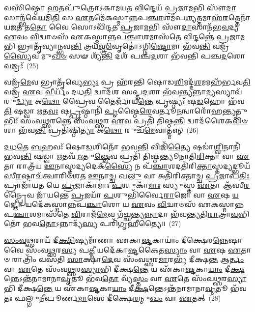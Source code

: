 {\anuvakamend[{\-\ul{𑌅}\-\-\ul{𑌤𑌿}\-\-\ul{𑌰𑌾}\-𑌤𑍍𑌰 𑌓𑌜᳴\-\ul{𑌸𑍍𑌯𑍇}\-𑌵 𑌷𑌟𑍍𑌤𑍍𑌰𑌿𑍞᳴𑌶𑌚𑍍𑌚}]}%

𑌵𑌸𑌿᳴𑌷𑍍𑌠𑍋 \ul{𑌹}\-𑌤𑌪𑍁᳴𑌤𑍍𑌰𑍋\-𑌽𑌕𑌾𑌮𑌯𑌤 \ul{𑌵𑌿}\-𑌨𑍍𑌦𑍇𑌯᳴ \ul{𑌪𑍍𑌰}\-𑌜𑌾\-\ul{𑌮}\-𑌭𑌿 𑌸𑍗᳴\-\ul{𑌦𑌾}\-𑌸𑌾𑌨𑍍𑌭᳴𑌵𑍇\-\ul{𑌯}\-𑌮𑌿\-\ul{𑌤𑌿} 𑌸 \ul{𑌏}\-𑌤𑌮𑍇᳴𑌕𑌸𑍍𑌮𑌾𑌨𑍍𑌨𑌪\-\ul{𑌞𑍍𑌚𑌾}\-𑌶𑌮᳴𑌪\-\ul{𑌶𑍍𑌯}\-𑌤𑍍𑌤𑌮𑌾𑌹᳴\-\ul{𑌰}\-𑌤𑍍𑌤𑍇𑌨𑌾᳴𑌯𑌜\-\ul{𑌤} 𑌤\-\ul{𑌤𑍋} 𑌵𑍈 𑌸𑍋\-𑌽𑌵𑌿᳴𑌨𑍍𑌦𑌤 \ul{𑌪𑍍𑌰}\-𑌜𑌾\-\ul{𑌮}\-𑌭𑌿 𑌸𑍗᳴\-\ul{𑌦𑌾}\-𑌸𑌾𑌨᳴𑌭\-\ul{𑌵}\-𑌦𑍍𑌯 \ul{𑌏}\-𑌵𑌂 \ul{𑌵𑌿}\-𑌦𑍍𑌵𑌾𑍞𑌸᳴ 𑌏𑌕𑌸𑍍𑌮𑌾𑌨𑍍𑌨𑌪\-\ul{𑌞𑍍𑌚𑌾}\-𑌶𑌮𑌾𑌸᳴𑌤𑍇 \ul{𑌵𑌿}\-𑌨𑍍𑌦𑌨𑍍𑌤𑍇॑ \ul{𑌪𑍍𑌰}\-𑌜𑌾\-\ul{𑌮}\-𑌭𑌿 𑌭𑍍𑌰𑌾𑌤𑍃᳴𑌵𑍍𑌯𑌾𑌨𑍍𑌭𑌵\-\ul{𑌨𑍍𑌤𑌿} 𑌤𑍍𑌰𑌯᳴\-\ul{𑌸𑍍𑌤𑍍𑌰𑌿}\-𑌵𑍃𑌤𑍋॑\-𑌽𑌗𑍍𑌨𑌿\-\ul{𑌷𑍍𑌟𑍋}\-𑌮𑌾 𑌭᳴𑌵\-\ul{𑌨𑍍𑌤𑌿} 𑌵𑌜𑍍𑌰᳴\-\ul{𑌸𑍍𑌯𑍈}\-𑌵 𑌮𑍁\-\ul{𑌖}\-\-\ul{𑍞} 𑌸𑍟 𑌶𑍍𑌯᳴\-\ul{𑌨𑍍𑌤𑌿} 𑌦𑌶᳴ 𑌪𑌞𑍍𑌚\-\ul{𑌦}\-𑌶𑌾 𑌭᳴𑌵𑌨𑍍𑌤𑌿 𑌪𑌞𑍍𑌚\-\ul{𑌦}\-𑌶𑍋 𑌵𑌜𑍍𑌰𑌃᳴~(25)

𑌵𑌜𑍍𑌰᳴\-\ul{𑌮𑍇}\-𑌵 𑌭𑍍𑌰𑌾𑌤𑍃᳴𑌵𑍍𑌯𑍇\-\ul{𑌭𑍍𑌯𑌃} 𑌪𑍍𑌰 𑌹᳴𑌰𑌨𑍍𑌤𑌿 𑌷𑍋𑌡\-\ul{𑌶𑌿}\-𑌮𑌦𑍍𑌦᳴\-\ul{𑌶}\-𑌮𑌮𑌹᳴𑌰𑍍𑌭𑌵\-\ul{𑌤𑌿} 𑌵𑌜𑍍𑌰᳴ \ul{𑌏}\-𑌵 \ul{𑌵𑍀}\-𑌰𑍍𑌯𑌂᳴ 𑌦𑌧\-\ul{𑌤𑌿} 𑌦𑍍𑌵𑌾𑌦᳴𑌶 𑌸𑌪𑍍𑌤\-\ul{𑌦}\-𑌶𑌾 𑌭᳴𑌵\-\ul{𑌨𑍍𑌤𑍍𑌯}\-𑌨𑍍𑌨𑌾\-\ul{𑌦𑍍𑌯}\-𑌸𑍍𑌯𑌾𑌵᳴𑌰𑍁\-\ul{𑌦𑍍𑌧𑍍𑌯𑌾} 𑌅\-\ul{𑌥𑍋} 𑌪𑍍𑌰𑍈𑌵 𑌤𑍈𑌰𑍍𑌜𑌾᳴𑌯\-\ul{𑌨𑍍𑌤𑍇} 𑌪𑍃𑌷𑍍𑌠𑍍𑌯𑌃᳴ 𑌷\-\ul{𑌡}\-𑌹𑍋 𑌭᳴𑌵\-\ul{𑌤𑌿} 𑌷𑌡𑍍𑌵𑌾 \ul{𑌋}\-𑌤\-\ul{𑌵𑌃} 𑌷\-\ul{𑌟𑍍𑌪𑍃}\-𑌷𑍍𑌠𑌾𑌨𑌿᳴ \ul{𑌪𑍃}\-𑌷𑍍𑌠𑍈\-\ul{𑌰𑍇}\-𑌵𑌰𑍍𑌤𑍂\-\ul{𑌨}\-𑌨𑍍𑌵𑌾𑌰𑍋᳴𑌹\-\ul{𑌨𑍍𑌤𑍍𑌯𑍃}\-𑌤𑍁𑌭𑌿𑌃᳴ 𑌸𑌂𑌵\-\ul{𑌥𑍍𑌸}\-𑌰𑌨𑍍𑌤𑍇 𑌸𑌂᳴𑌵\-\ul{𑌥𑍍𑌸}\-𑌰 \ul{𑌏}\-𑌵 𑌪𑍍𑌰𑌤𑌿᳴ 𑌤𑌿𑌷𑍍𑌠\-\ul{𑌨𑍍𑌤𑌿} 𑌦𑍍𑌵𑌾𑌦᳴𑌶𑍈𑌕\-\ul{𑌵𑌿}\-\-\ul{𑍞}\-𑌶𑌾 𑌭᳴𑌵\-\ul{𑌨𑍍𑌤𑌿} 𑌪𑍍𑌰𑌤𑌿᳴𑌷𑍍𑌠𑌿\-\ul{𑌤𑍍𑌯𑌾} 𑌅\-\ul{𑌥𑍋} 𑌰𑍁𑌚᳴\-\ul{𑌮𑍇}\-𑌵𑌾𑌤𑍍𑌮𑌨𑍍𑌨𑍍~(26)

\-\ul{𑌦}\-\-\ul{𑌧}\-\-\ul{𑌤𑍇} \ul{𑌬}\-𑌹𑌵𑌃᳴ 𑌷𑍋\-\ul{𑌡}\-𑌶𑌿𑌨𑍋᳴ 𑌭𑌵\-\ul{𑌨𑍍𑌤𑌿} 𑌵𑌿𑌜𑌿᳴\-\ul{𑌤𑍍𑌯𑍈} 𑌷𑌡𑌾॑\-\ul{𑌶𑍍𑌵𑌿}\-𑌨𑌾𑌨𑌿᳴ 𑌭𑌵\-\ul{𑌨𑍍𑌤𑌿} 𑌷𑌡𑍍𑌵𑌾 \ul{𑌋}\-𑌤𑌵᳴ \ul{𑌋}\-𑌤𑍁\-\ul{𑌷𑍍𑌵𑍇}\-𑌵 𑌪𑍍𑌰𑌤𑌿᳴ 𑌤𑌿𑌷𑍍𑌠𑌨𑍍𑌤𑍍𑌯𑍂𑌨𑌾𑌤𑌿\-\ul{𑌰𑌿}\-𑌕𑍍𑌤𑌾 𑌵𑌾 \ul{𑌏}\-𑌤𑌾 𑌰𑌾𑌤𑍍𑌰᳴𑌯 \ul{𑌊}\-𑌨𑌾𑌸𑍍𑌤𑌦𑍍𑌯𑌦𑍇𑌕᳴\-\ul{𑌸𑍍𑌯𑍈} 𑌨 𑌪᳴\-\ul{𑌞𑍍𑌚𑌾}\-𑌶𑌦𑌤𑌿᳴𑌰𑌿\-\ul{𑌕𑍍𑌤𑌾}\-𑌸𑍍𑌤𑌦𑍍𑌯𑌦𑍍𑌭𑍂𑌯᳴𑌸𑍀\-\ul{𑌰}\-𑌷𑍍𑌟𑌾𑌚᳴𑌤𑍍𑌵𑌾𑌰𑌿𑍞𑌶𑌤 \ul{𑌊}\-𑌨𑌾\-\ul{𑌚𑍍𑌚} 𑌖\-\ul{𑌲𑍁} 𑌵𑌾 𑌅𑌤𑌿᳴𑌰𑌿𑌕𑍍𑌤𑌾𑌚𑍍𑌚 \ul{𑌪𑍍𑌰}\-𑌜𑌾𑌪᳴\-\ul{𑌤𑌿𑌃} 𑌪𑍍𑌰𑌾𑌜𑌾᳴𑌯\-\ul{𑌤} 𑌯𑍇 \ul{𑌪𑍍𑌰}\-𑌜𑌾𑌕𑌾᳴𑌮𑌾𑌃 \ul{𑌪}\-𑌶𑍁𑌕𑌾᳴\-\ul{𑌮𑌾𑌃} 𑌸𑍍𑌯𑍁𑌸𑍍𑌤 \ul{𑌏}\-𑌤𑌾 𑌆᳴𑌸𑍀\-\ul{𑌰}\-𑌨𑍍𑌪𑍍𑌰𑍈𑌵 𑌜𑌾᳴𑌯𑌨𑍍𑌤𑍇 \ul{𑌪𑍍𑌰}\-𑌜𑌯𑌾᳴ \ul{𑌪}\-𑌶𑍁𑌭𑌿᳴𑌰𑍍𑌵𑍈\-\ul{𑌰𑌾}\-𑌜𑍋 𑌵𑌾 \ul{𑌏}\-𑌷 \ul{𑌯}\-𑌜𑍍𑌞𑍋 𑌯𑌦𑍇᳴𑌕𑌸𑍍𑌮𑌾𑌨𑍍𑌨𑌪\-\ul{𑌞𑍍𑌚𑌾}\-𑌶𑍋 𑌯 \ul{𑌏}\-𑌵𑌂 \ul{𑌵𑌿}\-𑌦𑍍𑌵𑌾𑍞𑌸᳴ 𑌏𑌕𑌸𑍍𑌮𑌾𑌨𑍍𑌨𑌪\-\ul{𑌞𑍍𑌚𑌾}\-𑌶𑌮𑌾𑌸᳴𑌤𑍇 \ul{𑌵𑌿}\-𑌰𑌾𑌜᳴\-\ul{𑌮𑍇}\-𑌵 𑌗᳴𑌚𑍍𑌛𑌨𑍍𑌤𑍍𑌯\-\ul{𑌨𑍍𑌨𑌾}\-𑌦𑌾 𑌭᳴𑌵𑌨𑍍𑌤𑍍𑌯𑌤𑌿\-\ul{𑌰𑌾}\-𑌤𑍍𑌰𑌾\-\ul{𑌵}\-𑌭𑌿𑌤𑍋᳴ 𑌭𑌵\-\ul{𑌤𑍋}\-\-𑌽𑌨𑍍𑌨𑌾𑌦𑍍𑌯᳴\-\ul{𑌸𑍍𑌯} 𑌪𑌰𑌿᳴𑌗𑍃𑌹𑍀𑌤𑍍𑌯𑍈॥~(27)

{\anuvakamend[{𑌵𑌜𑍍𑌰᳴ \ul{𑌆}\-𑌤𑍍𑌮\-\ul{𑌨𑍍𑌪𑍍𑌰}\-𑌜\-\ul{𑌯𑌾} 𑌦𑍍𑌵𑌾𑌵𑌿𑍞᳴𑌶𑌤𑌿𑌶𑍍𑌚}]}%

\-\ul{𑌸𑌂}\-\-\ul{𑌵}\-\-\ul{𑌥𑍍𑌸}\-𑌰𑌾𑌯᳴ 𑌦𑍀\-\ul{𑌕𑍍𑌷𑌿}\-𑌷𑍍𑌯𑌮𑌾᳴𑌣𑌾 𑌏𑌕𑌾\-\ul{𑌷𑍍𑌟}\-𑌕𑌾𑌯𑌾𑌂॑ 𑌦𑍀𑌕𑍍𑌷𑍇𑌰\-\ul{𑌨𑍍𑌨𑍇}\-𑌷𑌾 𑌵𑍈 𑌸𑌂᳴𑌵\-\ul{𑌥𑍍𑌸}\-𑌰\-\ul{𑌸𑍍𑌯} 𑌪\-\ul{𑌤𑍍𑌨𑍀} 𑌯𑌦𑍇᳴𑌕𑌾\-\ul{𑌷𑍍𑌟}\-𑌕𑍈𑌤\-\ul{𑌸𑍍𑌯𑌾𑌂} 𑌵𑌾 \ul{𑌏}\-𑌷 \ul{𑌏}\-𑌤𑌾𑍞 𑌰𑌾𑌤𑍍𑌰𑌿𑌂᳴ 𑌵𑌸𑌤𑌿 \ul{𑌸𑌾}\-𑌕𑍍𑌷𑌾\-\ul{𑌦𑍇}\-𑌵 𑌸𑌂᳴𑌵\-\ul{𑌥𑍍𑌸}\-𑌰\-\ul{𑌮𑌾}\-𑌰𑌭𑍍𑌯᳴ 𑌦𑍀𑌕𑍍𑌷\-\ul{𑌨𑍍𑌤} 𑌆\-\ul{𑌰𑍍𑌤𑌂} 𑌵𑌾 \ul{𑌏}\-𑌤𑍇 𑌸𑌂᳴𑌵\-\ul{𑌥𑍍𑌸}\-𑌰\-\ul{𑌸𑍍𑌯𑌾}\-𑌭𑌿 𑌦𑍀॑𑌕𑍍𑌷\-\ul{𑌨𑍍𑌤𑍇} 𑌯 𑌏᳴𑌕𑌾\-\ul{𑌷𑍍𑌟}\-𑌕𑌾\-\ul{𑌯𑌾𑌂} 𑌦𑍀\-\ul{𑌕𑍍𑌷}\-𑌨𑍍𑌤𑍇\-𑌽𑌨𑍍𑌤᳴𑌨𑌾𑌮𑌾𑌨𑌾\-\ul{𑌵𑍃}\-𑌤𑍂 𑌭᳴𑌵\-\ul{𑌤𑍋} 𑌵𑍍𑌯᳴\-\ul{𑌸𑍍𑌤𑌂} 𑌵𑌾 \ul{𑌏}\-𑌤𑍇 𑌸𑌂᳴𑌵\-\ul{𑌥𑍍𑌸}\-𑌰\-\ul{𑌸𑍍𑌯𑌾}\-𑌭𑌿 𑌦𑍀॑𑌕𑍍𑌷\-\ul{𑌨𑍍𑌤𑍇} 𑌯 𑌏᳴𑌕𑌾\-\ul{𑌷𑍍𑌟}\-𑌕𑌾\-\ul{𑌯𑌾𑌂} 𑌦𑍀\-\ul{𑌕𑍍𑌷}\-𑌨𑍍𑌤𑍇\-𑌽𑌨𑍍𑌤᳴𑌨𑌾𑌮𑌾𑌨𑌾\-\ul{𑌵𑍃}\-𑌤𑍂 𑌭᳴𑌵𑌤𑌃 𑌫𑌲𑍍𑌗𑍁𑌨𑍀𑌪𑍂𑌰𑍍𑌣\-\ul{𑌮𑌾}\-𑌸𑍇 𑌦𑍀॑𑌕𑍍𑌷𑍇\-\ul{𑌰}\-𑌨𑍍𑌮𑍁\-\ul{𑌖𑌂} 𑌵𑌾 \ul{𑌏}\-𑌤𑌤𑍍~(28)

